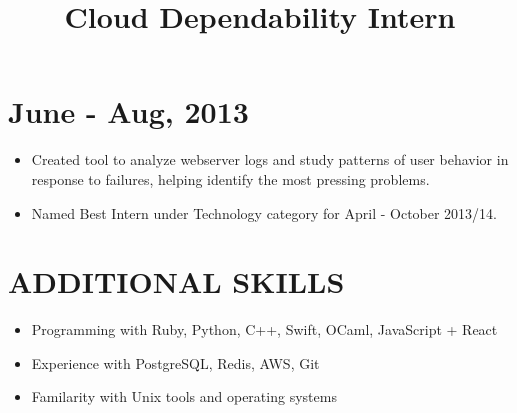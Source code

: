 \documentclass[centered, margin, 10pt]{res} %
\newcommand\mainsectionfont{\normalsize\bf\textup}
\renewcommand\sectionfont{\mainsectionfont} %
\renewcommand\dates{\section} %
\newenvironment{rlist}
    {\begin{minipage}[t]{\linewidth}\begin{itemize}\raggedright}
    {\end{itemize}\end{minipage}}
\newenvironment{positionlist}
    {\begin{position}\begin{rlist}}
    {\end{rlist}\end{position}}
\begin{document}
\begin{resume}

\title{Cloud Dependability Intern}
\dates{June - Aug, 2013}
\begin{positionlist}
  \item Created tool to analyze webserver logs and study patterns of user
    behavior in response to failures, helping identify the most pressing
    problems.
  \item Named Best Intern under Technology category for April - October 2013/14.
\end{positionlist}


\renewcommand\sectionfont{\mainsectionfont} %


\section{ADDITIONAL SKILLS}
\begin{rlist}
  \item Programming with Ruby, Python, C++, Swift, OCaml, JavaScript + React
  \item Experience with PostgreSQL, Redis, AWS, Git
  \item Familarity with Unix tools and operating systems
\end{rlist}


\end{resume}
\end{document}
